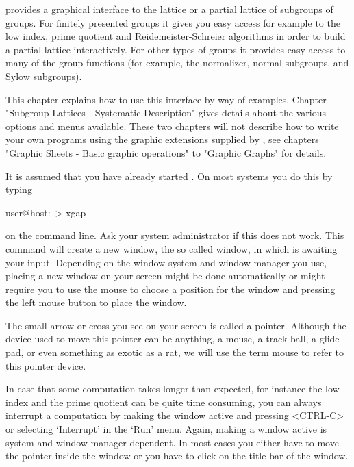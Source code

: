 
{\XGAP} provides a graphical interface to the  lattice or a partial lattice
of subgroups of groups.  For finitely  presented groups it gives you easy
access for example to the low index, prime quotient and Reidemeister-Schreier
algorithms in order to build a partial  lattice interactively.  For other
types of groups  it provides easy access to  many of  the group functions
(for example, the normalizer, normal subgroups, and Sylow subgroups).

This chapter explains  how to use this  interface by way of examples.  
Chapter  "Subgroup  Lattices - Systematic  Description" gives
details about the   various  options and menus available.    These two
chapters  will not  describe how to  write  your own programs using the
graphic extensions supplied by {\XGAP}, see chapters "Graphic Sheets -
Basic graphic operations" to "Graphic Graphs" for details.

It is assumed that you have already started {\XGAP}.  On most systems you
do this by typing

\begintt 
user@host:~> xgap 
\endtt

on  the  command line.   Ask your  system administrator  if this does not
work.  This   command  will create   a new window,   the so called {\GAP}
window, in which {\GAP} is awaiting your input.   Depending on the window
system and window manager  you use, placing a new  window on your  screen
might be  done  automatically or might  require  you to use the  mouse to
choose a position for the  window and pressing the  left mouse button  to
place the window.

The small arrow   or cross you see on   your screen is  called a pointer.
Although the device used to move this pointer can be anything, a mouse, a
track ball, a glide-pad, or even something as exotic as a rat, we will use
the term mouse to refer to this pointer device.

In case that some computation takes longer than expected, for instance
the low index and the prime quotient can be quite time consuming, you
can always interrupt a computation by making the {\GAP} window active
and pressing <CTRL-C> or selecting `Interrupt' in the `Run' menu.
Again, making a window active is system and window manager dependent.
In most cases you either have to move the pointer inside the {\GAP}
window or you have to click on the title bar of the {\GAP} window.

